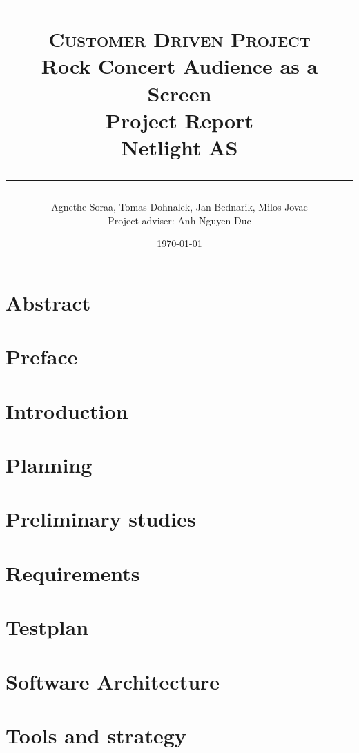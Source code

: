 \documentclass{report}
\title{
	\hrule
    \normalsize \textsc{Customer Driven Project}\\
    \Huge Rock Concert Audience as a Screen\\[10pt]
    \normalsize Project Report\\[10pt]
    Netlight AS
    \hrule
    }
\author{Agnethe Soraa,
Tomas Dohnalek,
Jan Bednarik,
Milos Jovac \\
\normalsize Project adviser: Anh Nguyen Duc}
\date{\today}
\begin{document}
\maketitle
\chapter*{Abstract}

\chapter*{Preface}
%
\tableofcontents
\setcounter{page}{3}
\chapter{Introduction}
\chapter{Planning}
%
\chapter{Preliminary studies}
%

\chapter{Requirements}
%

\chapter{Testplan}
%

\chapter{Software Architecture}
%

\chapter{Tools and strategy}
%
\end{document}
